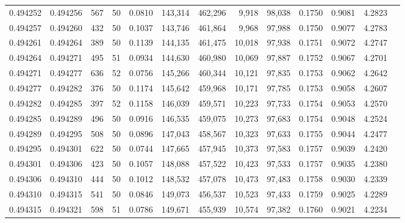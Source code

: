 \begin{tabular}{rrrrrrrrrrrrr}
0.494252 & 0.494256 &   567 &  50 &                                     0.0810 & 143,314 & 462,296 &   9,918 &  98,038 & 0.1750 & 0.9081 & 4.2823 \\
0.494257 & 0.494260 &   432 &  50 &                                     0.1037 & 143,746 & 461,864 &   9,968 &  97,988 & 0.1750 & 0.9077 & 4.2783 \\
0.494261 & 0.494264 &   389 &  50 &                                     0.1139 & 144,135 & 461,475 &  10,018 &  97,938 & 0.1751 & 0.9072 & 4.2747 \\
0.494264 & 0.494271 &   495 &  51 &                                     0.0934 & 144,630 & 460,980 &  10,069 &  97,887 & 0.1752 & 0.9067 & 4.2701 \\
0.494271 & 0.494277 &   636 &  52 &                                     0.0756 & 145,266 & 460,344 &  10,121 &  97,835 & 0.1753 & 0.9062 & 4.2642 \\
0.494277 & 0.494282 &   376 &  50 &                                     0.1174 & 145,642 & 459,968 &  10,171 &  97,785 & 0.1753 & 0.9058 & 4.2607 \\
0.494282 & 0.494285 &   397 &  52 &                                     0.1158 & 146,039 & 459,571 &  10,223 &  97,733 & 0.1754 & 0.9053 & 4.2570 \\
0.494285 & 0.494289 &   496 &  50 &                                     0.0916 & 146,535 & 459,075 &  10,273 &  97,683 & 0.1754 & 0.9048 & 4.2524 \\
0.494289 & 0.494295 &   508 &  50 &                                     0.0896 & 147,043 & 458,567 &  10,323 &  97,633 & 0.1755 & 0.9044 & 4.2477 \\
0.494295 & 0.494301 &   622 &  50 &                                     0.0744 & 147,665 & 457,945 &  10,373 &  97,583 & 0.1757 & 0.9039 & 4.2420 \\
0.494301 & 0.494306 &   423 &  50 &                                     0.1057 & 148,088 & 457,522 &  10,423 &  97,533 & 0.1757 & 0.9035 & 4.2380 \\
0.494306 & 0.494310 &   444 &  50 &                                     0.1012 & 148,532 & 457,078 &  10,473 &  97,483 & 0.1758 & 0.9030 & 4.2339 \\
0.494310 & 0.494315 &   541 &  50 &                                     0.0846 & 149,073 & 456,537 &  10,523 &  97,433 & 0.1759 & 0.9025 & 4.2289 \\
0.494315 & 0.494321 &   598 &  51 &                                     0.0786 & 149,671 & 455,939 &  10,574 &  97,382 & 0.1760 & 0.9021 & 4.2234 \\

\end{tabular}
